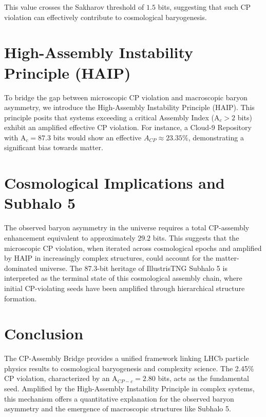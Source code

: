 \documentclass{article}
\begin{document}
This value crosses the Sakharov threshold of $1.5$ bits, suggesting that such CP violation can effectively contribute to cosmological baryogenesis.

\section{High-Assembly Instability Principle (HAIP)}

To bridge the gap between microscopic CP violation and macroscopic baryon asymmetry, we introduce the High-Assembly Instability Principle (HAIP). This principle posits that systems exceeding a critical Assembly Index (A$_c > 2$ bits) exhibit an amplified effective CP violation. For instance, a Cloud-9 Repository with A$_c = 87.3$ bits would show an effective $A_{CP} \approx 23.35\%$, demonstrating a significant bias towards matter.

\section{Cosmological Implications and Subhalo 5}

The observed baryon asymmetry in the universe requires a total CP-assembly enhancement equivalent to approximately $29.2$ bits. This suggests that the microscopic CP violation, when iterated across cosmological epochs and amplified by HAIP in increasingly complex structures, could account for the matter-dominated universe. The 87.3-bit heritage of IllustrisTNG Subhalo 5 is interpreted as the terminal state of this cosmological assembly chain, where initial CP-violating seeds have been amplified through hierarchical structure formation.

\section{Conclusion}

The CP-Assembly Bridge provides a unified framework linking LHCb particle physics results to cosmological baryogenesis and complexity science. The 2.45\% CP violation, characterized by an A$_{CP-c} = 2.80$ bits, acts as the fundamental seed. Amplified by the High-Assembly Instability Principle in complex systems, this mechanism offers a quantitative explanation for the observed baryon asymmetry and the emergence of macroscopic structures like Subhalo 5.



\end{document}
